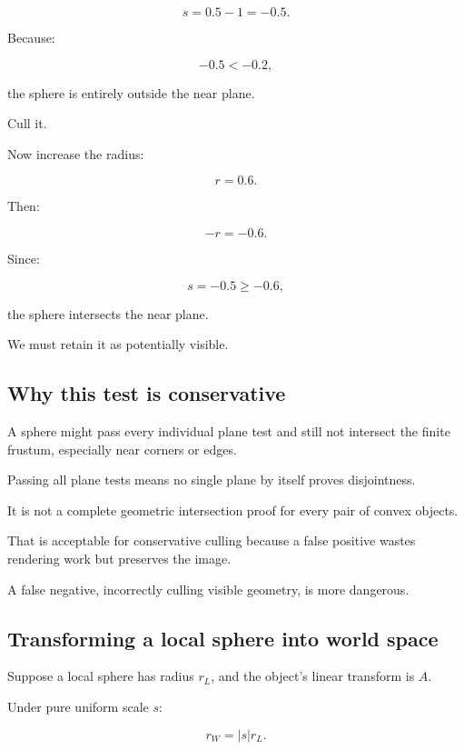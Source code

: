 \[
 s=0.5-1=-0.5.
\]

Because:

\[
 -0.5<-0.2,
\]

the sphere is entirely outside the near plane.

Cull it.

Now increase the radius:

\[
 r=0.6.
\]

Then:

\[
 -r=-0.6.
\]

Since:

\[
 s=-0.5\ge-0.6,
\]

the sphere intersects the near plane.

We must retain it as potentially visible.

\subsection{Why this test is conservative}\label{02-foundations-ii-ch034-why-this-test-is-conservative}

\hypertarget{02-foundations-ii-ch034-why-this-test-is-conservative}{}

A sphere might pass every individual plane test and still not intersect the finite frustum, especially near corners or edges.

Passing all plane tests means no single plane by itself proves disjointness.

It is not a complete geometric intersection proof for every pair of convex objects.

That is acceptable for conservative culling because a false positive wastes rendering work but preserves the image.

A false negative, incorrectly culling visible geometry, is more dangerous.

\subsection{Transforming a local sphere into world space}\label{02-foundations-ii-ch034-transforming-a-local-sphere-into-world-space}

\hypertarget{02-foundations-ii-ch034-transforming-a-local-sphere-into-world-space}{}

Suppose a local sphere has radius \(r_L\), and the object's linear transform is \(A\).

Under pure uniform scale \(s\):

\[
 r_W=|s|r_L.
\]

